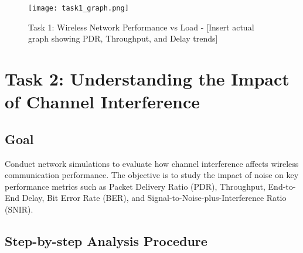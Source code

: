 \documentclass{article}
\begin{document}
\begin{figure}[H]

  \centering

  \texttt{[image: task1\_graph.png]}

  \caption{Task 1: Wireless Network Performance vs Load - [Insert actual graph showing PDR, Throughput, and Delay trends]}

  \label{fig:task1_performance}

\end{figure}

\newpage

\section{Task 2: Understanding the Impact of Channel Interference}

\subsection{Goal}

Conduct network simulations to evaluate how channel interference affects wireless communication performance. The objective is to study the impact of noise on key performance metrics such as Packet Delivery Ratio (PDR), Throughput, End-to-End Delay, Bit Error Rate (BER), and Signal-to-Noise-plus-Interference Ratio (SNIR).

\subsection{Step-by-step Analysis Procedure}
\end{document}
